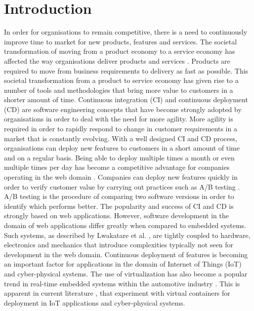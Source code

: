 \iffalse  \fi
%
\chapter{Introduction}
In order for organisations to remain competitive, there is a need to continuously improve time to market for new products, features and services. The societal transformation of moving from a product economy to a service economy has affected the way organisations deliver products and services \cite{mckinsey}. Products are required to move from business requirements to delivery as fast as possible. This societal transformation from a product to service economy has given rise to a number of tools and methodologies that bring more value to customers in a shorter amount of time. Continuous integration (CI) and continuous deployment (CD) are software engineering concepts that have become strongly adopted by organisations in order to deal with the need for more agility. More agility is required in order to rapidly respond to change in customer requirements in a market that is constantly evolving. With a well designed CI and CD process, organisations can deploy new features to customers in a short amount of time and on a regular basis. Being able to deploy multiple times a month or even multiple times per day has become a competitive advantage for companies operating in the web domain \cite{facebook}. Companies can deploy new features quickly in order to verify customer value by carrying out practices such as A/B testing \cite{abtest}. A/B testing is the procedure of comparing two software versions in order to identify which performs better. The popularity and success of CI and CD is strongly based on web applications. However, software development in the domain of web applications differ greatly when compared to embedded systems. Such systems, as described by Lwakatare et al. \cite{7427859}, are tightly coupled to hardware, electronics and mechanics that introduce complexities typically not seen for development in the web domain. Continuous deployment of features is becoming an important factor for applications in the domain of Internet of Things (IoT) and cyber-physical systems. The use of virtualization has also become a popular trend in real-time embedded systems within the automotive industry \cite{aich}. This is apparent in current literature \cite{gonz,cberger,2iot}, that experiment with virtual containers for deployment in IoT applications and cyber-physical systems. \\

